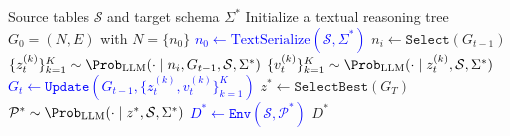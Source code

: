 
\begin{algorithm}[t]
\small
\caption{Direct ToT Adaptation for Data Preparation}
\label{alg:tot}
\begin{algorithmic}[1]
\Require Source tables $\mathcal{S}$ and target schema $\Sigma^*$
\State Initialize a textual reasoning tree $G_0=(N,E)$ with $N=\{n_0\}$
\State \textcolor{blue}{$n_0 \leftarrow \text{TextSerialize}(\mathcal{S}, \Sigma^*)$}
    \State $n_i \leftarrow \mathtt{Select}(G_{t-1})$ 
    \State \textcolor{blue}{$\{z_{t}^{(k)}\}_{k=1}^{K} \sim 
    \Prob_{\text{LLM}}(\cdot \mid n_i, G_{t-1}, \mathcal{S}, \Sigma^*)$}
    \State \textcolor{blue}{$\{v_{t}^{(k)}\}_{k=1}^{K} \sim 
    \Prob_{\text{LLM}}(\cdot \mid z_t^{(k)}, \mathcal{S}, \Sigma^*)$}
    \State \textcolor{blue}{$G_t \leftarrow \mathtt{Update}(G_{t-1}, \{z_t^{(k)}, v_t^{(k)}\}_{k=1}^{K})$}
\EndWhile
\State $z^* \leftarrow \mathtt{SelectBest}(G_T)$
\State $\mathcal{P}^* \sim \Prob_{\text{LLM}}(\cdot \mid z^*, \mathcal{S}, \Sigma^*)$
\State \textcolor{blue}{$D^* \leftarrow \mathtt{Env}(\mathcal{S}, \mathcal{P}^*)$}
\State \Return $D^*$
\end{algorithmic}
\end{algorithm}


